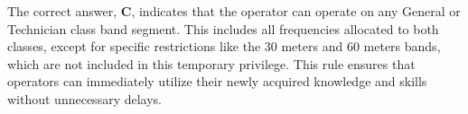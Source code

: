 The correct answer, \textbf{C}, indicates that the operator can operate on any General or Technician class band segment. This includes all frequencies allocated to both classes, except for specific restrictions like the 30 meters and 60 meters bands, which are not included in this temporary privilege. This rule ensures that operators can immediately utilize their newly acquired knowledge and skills without unnecessary delays.

